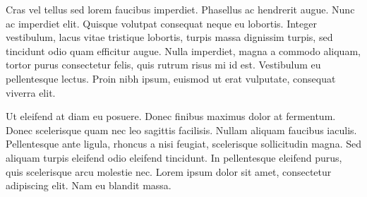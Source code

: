 \begin{spacing}{1.5}
    Cras vel tellus sed lorem faucibus imperdiet. Phasellus ac hendrerit augue. Nunc ac imperdiet elit. Quisque volutpat consequat neque eu lobortis. Integer vestibulum, lacus vitae tristique lobortis, turpis massa dignissim turpis, sed tincidunt odio quam efficitur augue. Nulla imperdiet, magna a commodo aliquam, tortor purus consectetur felis, quis rutrum risus mi id est. Vestibulum eu pellentesque lectus. Proin nibh ipsum, euismod ut erat vulputate, consequat viverra elit.

    Ut eleifend at diam eu posuere. Donec finibus maximus dolor at fermentum. Donec scelerisque quam nec leo sagittis facilisis. Nullam aliquam faucibus iaculis. Pellentesque ante ligula, rhoncus a nisi feugiat, scelerisque sollicitudin magna. Sed aliquam turpis eleifend odio eleifend tincidunt. In pellentesque eleifend purus, quis scelerisque arcu molestie nec. Lorem ipsum dolor sit amet, consectetur adipiscing elit. Nam eu blandit massa. 

\end{spacing} %